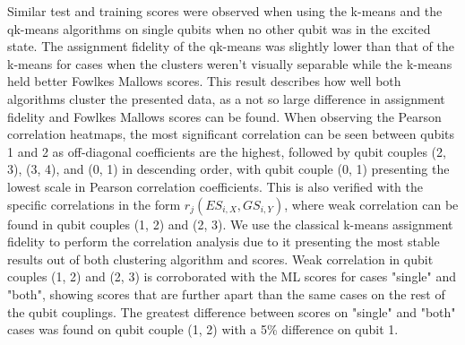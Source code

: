 \documentclass[conference]{IEEEtran}
\begin{document}
Similar test and training scores were observed when using the k-means and the qk-means algorithms on single qubits when no other qubit was in the excited state. The assignment fidelity of the qk-means was slightly lower than that of the k-means for cases when the clusters weren't visually separable while the k-means held better Fowlkes Mallows scores. This result describes how well both algorithms cluster the presented data, as a not so large difference in assignment fidelity and Fowlkes Mallows scores can be found. When observing the Pearson correlation heatmaps, the most significant correlation can be seen between qubits 1 and 2 as off-diagonal coefficients are the highest, followed by qubit couples (2, 3), (3, 4), and (0, 1) in descending order, with qubit couple (0, 1) presenting the lowest scale in Pearson correlation coefficients. This is also verified with the specific correlations in the form $ r_j(ES_{i,X}, GS_{i,Y}) $, where weak correlation can be found in qubit couples (1, 2) and (2, 3). We use the classical k-means assignment fidelity to perform the correlation analysis due to it presenting the most stable results out of both clustering algorithm and scores. Weak correlation in qubit couples (1, 2) and (2, 3) is corroborated with the ML scores for cases "single" and "both", showing scores that are further apart than the same cases on the rest of the qubit couplings. The greatest difference between scores on "single" and "both" cases was found on qubit couple (1, 2) with a 5\% difference on qubit 1.
\end{document}
